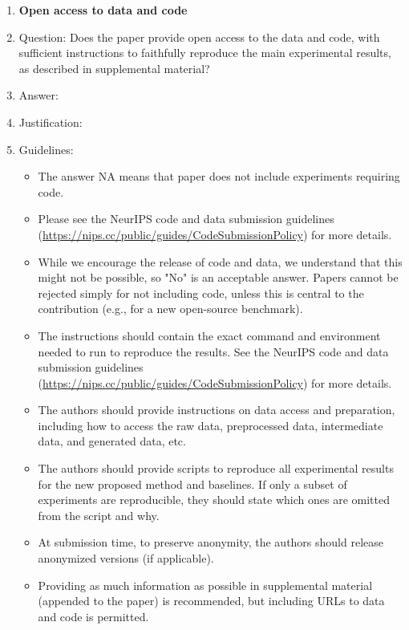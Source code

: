 \documentclass{article}
\begin{document}
\begin{enumerate}
\item {\bf Open access to data and code}
    \item[] Question: Does the paper provide open access to the data and code, with sufficient instructions to faithfully reproduce the main experimental results, as described in supplemental material?
    \item[] Answer: \answerTODO{} %
    \item[] Justification: \justificationTODO{}
    \item[] Guidelines:
    \begin{itemize}
        \item The answer NA means that paper does not include experiments requiring code.
        \item Please see the NeurIPS code and data submission guidelines (\url{https://nips.cc/public/guides/CodeSubmissionPolicy}) for more details.
        \item While we encourage the release of code and data, we understand that this might not be possible, so "No" is an acceptable answer. Papers cannot be rejected simply for not including code, unless this is central to the contribution (e.g., for a new open-source benchmark).
        \item The instructions should contain the exact command and environment needed to run to reproduce the results. See the NeurIPS code and data submission guidelines (\url{https://nips.cc/public/guides/CodeSubmissionPolicy}) for more details.
        \item The authors should provide instructions on data access and preparation, including how to access the raw data, preprocessed data, intermediate data, and generated data, etc.
        \item The authors should provide scripts to reproduce all experimental results for the new proposed method and baselines. If only a subset of experiments are reproducible, they should state which ones are omitted from the script and why.
        \item At submission time, to preserve anonymity, the authors should release anonymized versions (if applicable).
        \item Providing as much information as possible in supplemental material (appended to the paper) is recommended, but including URLs to data and code is permitted.
    \end{itemize}



\end{enumerate}
\end{document}
